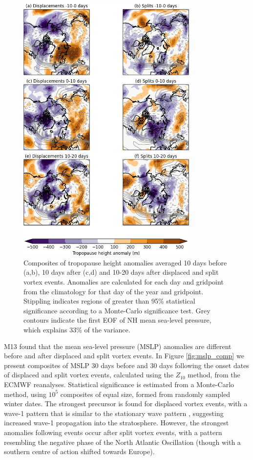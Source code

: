 \begin{figure}
 \centering
 \noindent\includegraphics[width=0.8\textwidth]{figures/chapter-moments/tropopause_height_composites_nam_crop.png}
 \caption[Tropopause height composites for split and displaced vortex
 events.]{Composites of tropopause height anomalies averaged 10 days before
   (a,b), 10 days after (c,d) and 10-20 days after displaced and split vortex
   events. Anomalies are calculated for each day and gridpoint from the
   climatology for that day of the year and gridpoint. Stippling indicates
   regions of greater than 95\% statistical significance according to a
   Monte-Carlo significance test. Grey contours indicate the first EOF of NH
   mean sea-level pressure, which explains 33\% of the variance.}
 \label{Fig3}
\end{figure}



M13 found that the mean sea-level pressure (MSLP) anomalies are different before
and after displaced and split vortex events. In Figure \ref{fig:mslp_comp} we
present composites of MSLP 30 days before and 30 days following the onset dates
of displaced and split vortex events, calculated using the $Z_{10}$ method, from
the ECMWF reanalyses. Statistical significance is estimated from a Monte-Carlo
method, using $10^{5}$ composites of equal size, formed from randomly sampled
winter dates. The strongest precursor is found for displaced vortex events, with
a wave-1 pattern that is similar to the stationary wave pattern
\citep[e.g.][]{Garfinkel2008}, suggesting increased wave-1 propagation into the
stratosphere. However, the strongest anomalies following events occur after
split vortex events, with a pattern resembling the negative phase of the North
Atlantic Oscillation (though with a southern centre of action shifted towards
Europe).

